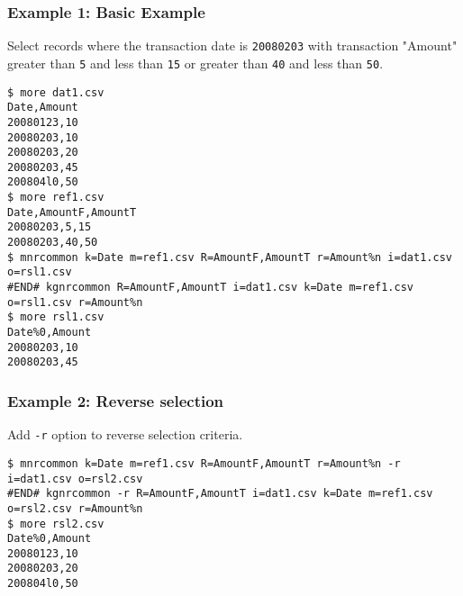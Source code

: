\subsubsection*{Example 1: Basic Example}

Select records where the transaction date is \verb|20080203| with transaction "Amount" greater than \verb|5| and less than \verb|15| or greater than \verb|40| and less than \verb|50|.


\begin{Verbatim}[baselinestretch=0.7,frame=single]
$ more dat1.csv
Date,Amount
20080123,10
20080203,10
20080203,20
20080203,45
200804l0,50
$ more ref1.csv
Date,AmountF,AmountT
20080203,5,15
20080203,40,50
$ mnrcommon k=Date m=ref1.csv R=AmountF,AmountT r=Amount%n i=dat1.csv o=rsl1.csv
#END# kgnrcommon R=AmountF,AmountT i=dat1.csv k=Date m=ref1.csv o=rsl1.csv r=Amount%n
$ more rsl1.csv
Date%0,Amount
20080203,10
20080203,45
\end{Verbatim}
\subsubsection*{Example 2: Reverse selection}

Add \verb|-r| option to reverse selection criteria.


\begin{Verbatim}[baselinestretch=0.7,frame=single]
$ mnrcommon k=Date m=ref1.csv R=AmountF,AmountT r=Amount%n -r i=dat1.csv o=rsl2.csv
#END# kgnrcommon -r R=AmountF,AmountT i=dat1.csv k=Date m=ref1.csv o=rsl2.csv r=Amount%n
$ more rsl2.csv
Date%0,Amount
20080123,10
20080203,20
200804l0,50
\end{Verbatim}
